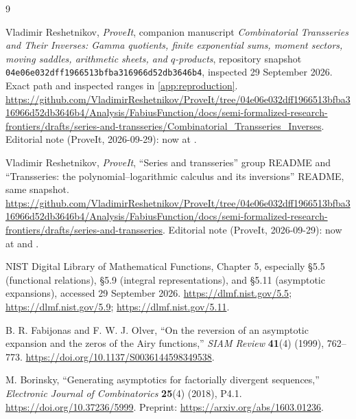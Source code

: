 \documentclass[11pt,a4paper]{article}
\theoremstyle{definition}
\numberwithin{equation}{section}
\begin{document}
\clearpage
\begin{thebibliography}{9}

Vladimir Reshetnikov, \emph{ProveIt}, companion manuscript
\emph{Combinatorial Transseries and Their Inverses: Gamma quotients, finite exponential sums, moment sectors, moving saddles, arithmetic sheets, and $q$-products}, repository snapshot
\texttt{04e06e032dff1966513bfba316966d52db3646b4}, inspected 29 September 2026. Exact path and inspected ranges in \cref{app:reproduction}.
\url{https://github.com/VladimirReshetnikov/ProveIt/tree/04e06e032dff1966513bfba316966d52db3646b4/Analysis/FabiusFunction/docs/semi-formalized-research-frontiers/drafts/series-and-transseries/Combinatorial_Transseries_Inverses}.
\newline Editorial note (ProveIt, 2026-09-29): now at .

Vladimir Reshetnikov, \emph{ProveIt}, ``Series and transseries'' group README and ``Transseries: the polynomial--logarithmic calculus and its inversions'' README, same snapshot.\newline
\url{https://github.com/VladimirReshetnikov/ProveIt/tree/04e06e032dff1966513bfba316966d52db3646b4/Analysis/FabiusFunction/docs/semi-formalized-research-frontiers/drafts/series-and-transseries}.
\newline Editorial note (ProveIt, 2026-09-29): now at  and .

NIST Digital Library of Mathematical Functions, Chapter 5, especially \S5.5 (functional relations), \S5.9 (integral representations), and \S5.11 (asymptotic expansions), accessed 29 September 2026.
\url{https://dlmf.nist.gov/5.5};
\url{https://dlmf.nist.gov/5.9};
\url{https://dlmf.nist.gov/5.11}.

B. R. Fabijonas and F. W. J. Olver,
``On the reversion of an asymptotic expansion and the zeros of the Airy functions,''
\emph{SIAM Review} \textbf{41}(4) (1999), 762--773.
\url{https://doi.org/10.1137/S0036144598349538}.

M. Borinsky, ``Generating asymptotics for factorially divergent sequences,''
\emph{Electronic Journal of Combinatorics} \textbf{25}(4) (2018), P4.1.
\url{https://doi.org/10.37236/5999}.
Preprint: \url{https://arxiv.org/abs/1603.01236}.


\end{thebibliography}
\end{document}
